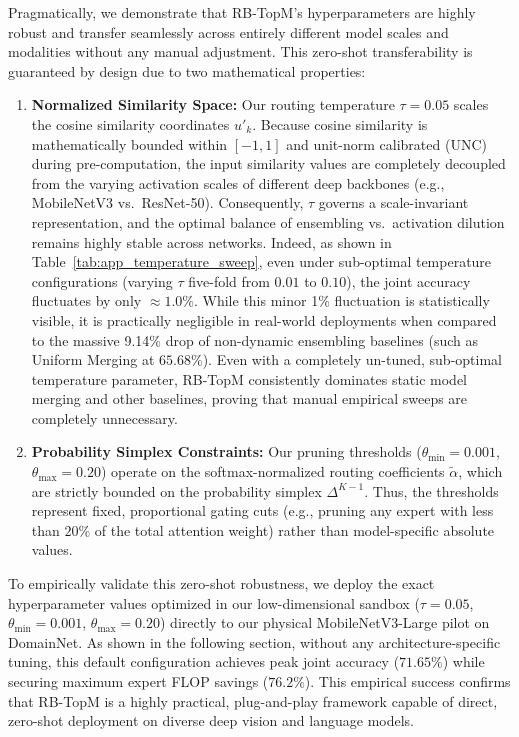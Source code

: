 \documentclass{article}
\theoremstyle{plain}
\theoremstyle{definition}
\theoremstyle{remark}
\begin{document}
Pragmatically, we demonstrate that RB-TopM's hyperparameters are highly robust and transfer seamlessly across entirely different model scales and modalities without any manual adjustment. This zero-shot transferability is guaranteed by design due to two mathematical properties:
\begin{enumerate}
    \item \textbf{Normalized Similarity Space:} Our routing temperature $\tau = 0.05$ scales the cosine similarity coordinates $u'_k$. Because cosine similarity is mathematically bounded within $[-1, 1]$ and unit-norm calibrated (UNC) during pre-computation, the input similarity values are completely decoupled from the varying activation scales of different deep backbones (e.g., MobileNetV3 vs.\ ResNet-50). Consequently, $\tau$ governs a scale-invariant representation, and the optimal balance of ensembling vs.\ activation dilution remains highly stable across networks. Indeed, as shown in Table~\ref{tab:app_temperature_sweep}, even under sub-optimal temperature configurations (varying $\tau$ five-fold from $0.01$ to $0.10$), the joint accuracy fluctuates by only $\approx 1.0\%$. While this minor 1\% fluctuation is statistically visible, it is practically negligible in real-world deployments when compared to the massive 9.14\% drop of non-dynamic ensembling baselines (such as Uniform Merging at $65.68\%$). Even with a completely un-tuned, sub-optimal temperature parameter, RB-TopM consistently dominates static model merging and other baselines, proving that manual empirical sweeps are completely unnecessary.
    \item \textbf{Probability Simplex Constraints:} Our pruning thresholds ($\theta_{\min} = 0.001$, $\theta_{\max} = 0.20$) operate on the softmax-normalized routing coefficients $\tilde{\alpha}$, which are strictly bounded on the probability simplex $\Delta^{K-1}$. Thus, the thresholds represent fixed, proportional gating cuts (e.g., pruning any expert with less than $20\%$ of the total attention weight) rather than model-specific absolute values.
\end{enumerate}
To empirically validate this zero-shot robustness, we deploy the exact hyperparameter values optimized in our low-dimensional sandbox ($\tau = 0.05$, $\theta_{\min} = 0.001$, $\theta_{\max} = 0.20$) directly to our physical MobileNetV3-Large pilot on DomainNet. As shown in the following section, without any architecture-specific tuning, this default configuration achieves peak joint accuracy ($71.65\%$) while securing maximum expert FLOP savings ($76.2\%$). This empirical success confirms that RB-TopM is a highly practical, plug-and-play framework capable of direct, zero-shot deployment on diverse deep vision and language models.
\end{document}

